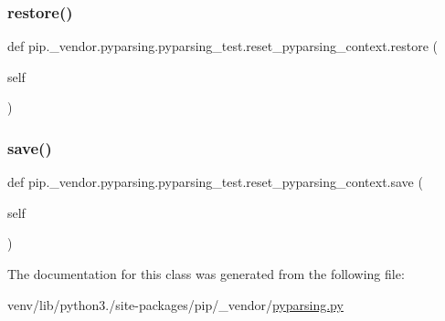 \subsubsection{\texorpdfstring{restore()}{restore()}}
{\footnotesize\ttfamily def pip.\+\_\+vendor.\+pyparsing.\+pyparsing\+\_\+test.\+reset\+\_\+pyparsing\+\_\+context.\+restore (\begin{DoxyParamCaption}\item[{}]{self }\end{DoxyParamCaption})}

\mbox{\label{classpip_1_1__vendor_1_1pyparsing_1_1pyparsing__test_1_1reset__pyparsing__context_a3f3c83458537994b396f7815214e0ce2}} 
\subsubsection{\texorpdfstring{save()}{save()}}
{\footnotesize\ttfamily def pip.\+\_\+vendor.\+pyparsing.\+pyparsing\+\_\+test.\+reset\+\_\+pyparsing\+\_\+context.\+save (\begin{DoxyParamCaption}\item[{}]{self }\end{DoxyParamCaption})}



The documentation for this class was generated from the following file\+:\begin{DoxyCompactItemize}
\item 
venv/lib/python3./site-\/packages/pip/\+\_\+vendor/\hyperlink{pip_2__vendor_2pyparsing_8py}{pyparsing.\+py}\end{DoxyCompactItemize}
